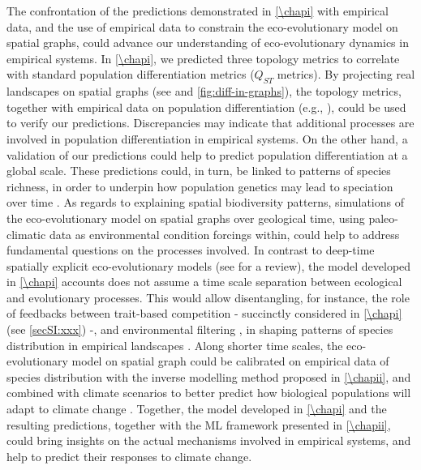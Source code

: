The confrontation of the predictions demonstrated in \cref{\chapi} with empirical data, and the use of empirical data to constrain the eco-evolutionary model on spatial graphs, could advance our understanding of eco-evolutionary dynamics in empirical systems.
% 
In \cref{\chapi}, we predicted three topology metrics to correlate with standard population differentiation metrics ($Q_{ST}$ metrics). By projecting real landscapes on spatial graphs (see \cite{Dale2010} and \cref{fig:diff-in-graphs}), the topology metrics, together with empirical data on population differentiation (e.g., \citep{Manel2003}), could be used to verify our predictions. Discrepancies may indicate that additional processes are involved in population differentiation in empirical systems. On the other hand, a validation of our predictions could help to predict population differentiation at a global scale. These predictions could, in turn, be linked to patterns of species richness, in order to underpin how population genetics may lead to speciation over time \citep{Templeton1981}.
% 
As regards to explaining spatial biodiversity patterns, simulations of the eco-evolutionary model on spatial graphs over geological time, using paleo-climatic data \citep{STRAUME2020126} as environmental condition forcings within, could help to address fundamental questions on the processes involved. In contrast to deep-time spatially explicit eco-evolutionary models (see \cite{Hagen2022} for a review), the model developed in \cref{\chapi} accounts does not assume a time scale separation between ecological and evolutionary processes.
% 
This would allow disentangling, for instance, the role of feedbacks between trait-based competition \citep{Dieckmann1999} - succinctly considered in \cref{\chapi} (see \cref{secSI:xxx}) -, and environmental filtering \citep{Doebeli2003}, in shaping patterns of species distribution in empirical landscapes \cite{Rahbek2019a}. %
% 
Along shorter time scales, the eco-evolutionary model on spatial graph could be calibrated on empirical data of species distribution \cite{Abegg2020,Gisler2008,GBIF:TheGlobalBiodiversityInformationFacility2022} with the inverse modelling method proposed in \cref{\chapii}, and combined with climate scenarios \citep{Kriticos2012} to better predict how biological populations will adapt to climate change \citep{Norberg2012,Urban2016}.
% 
Together, the model developed in \cref{\chapi} and the resulting predictions, together with the ML framework presented in \cref{\chapii}, could bring insights on the actual mechanisms involved in empirical systems, and help to predict their responses to climate change. 


